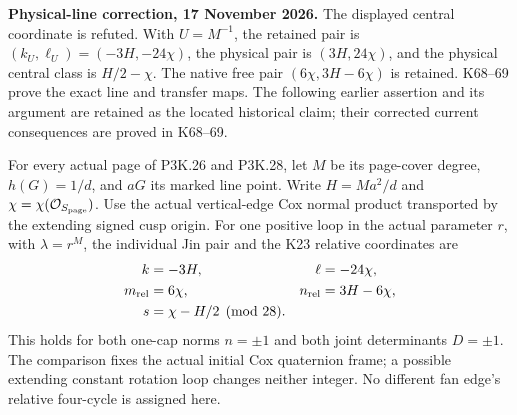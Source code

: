 \begin{theorem}\label{night:P3K.30}
\par\noindent\textbf{Physical-line correction, 17 November 2026.} The displayed central coordinate is refuted. With \(U=M^{-1}\), the retained pair is \((k_U,\ell_U)=(-3H,-24\chi)\), the physical pair is \((3H,24\chi)\), and the physical central class is \(H/2-\chi\). The native free pair \((6\chi,3H-6\chi)\) is retained. K68--69 prove the exact line and transfer maps. The following earlier assertion and its argument are retained as the located historical claim; their corrected current consequences are proved in K68--69.\medskip\par 

For every actual page of P3K.26 and P3K.28, let \(M\) be its page-cover degree,
\(h(G)=1/d\), and \(aG\) its marked line point. Write
\(H=Ma^2/d\) and \(\chi=\chi(\mathcal O_{S_{\rm page}})\).
Use the actual vertical-edge Cox normal product transported by the
extending signed cusp origin. For one positive loop in the actual
parameter \(r\), with \(\lambda=r^M\), the individual Jin pair and
the K23 relative coordinates are
\[
 \begin{aligned}
 k&=-3H,&\ell&=-24\chi,\\
 m_{\rm rel}&=6\chi,&n_{\rm rel}&=3H-6\chi,\\
 s&=\chi-H/2\pmod{28}.
 \end{aligned}
\]
This holds for both one-cap norms \(n=\pm1\) and both joint determinants
\(D=\pm1\). The comparison fixes the actual initial Cox quaternion
frame; a possible extending constant rotation loop changes neither
integer. No different fan edge's relative four-cycle is assigned here.

\end{theorem}
